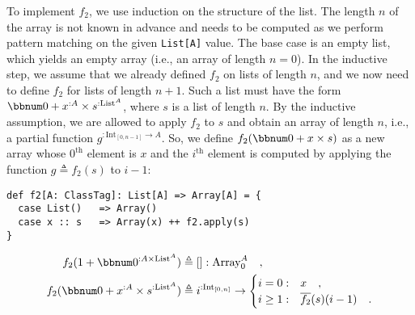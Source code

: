 To implement $f_{2}$, we use induction on the structure of the list.
The length $n$ of the array is not known in advance and needs to
be computed as we perform pattern matching on the given \lstinline!List[A]!
value. The base case is an empty list, which yields an empty array
(i.e., an array of length $n=0$). In the inductive step, we assume
that we already defined $f_{2}$ on lists of length $n$, and we now
need to define $f_{2}$ for lists of length $n+1$. Such a list must
have the form $\bbnum 0+x^{:A}\times s^{:\text{List}^{A}}$, where
$s$ is a list of length $n$. By the inductive assumption, we are
allowed to apply $f_{2}$ to $s$ and obtain an array of length $n$,
i.e., a partial function $g^{:\text{Int}_{[0,n-1]}\rightarrow A}$.
So, we define $f_{2}(\bbnum 0+x\times s)$ as a new array whose $0^{\text{th}}$
element is $x$ and the $i^{\text{th}}$ element is computed by applying
the function $g\triangleq f_{2}(s)$ to $i-1$:
\begin{lstlisting}
def f2[A: ClassTag]: List[A] => Array[A] = {
  case List()   => Array()
  case x :: s   => Array(x) ++ f2.apply(s)
}
\end{lstlisting}
\begin{align*}
f_{2}(1+\bbnum 0^{:A\times\text{List}^{A}}) & \triangleq[]:\text{Array}_{0}^{A}\quad,\\
f_{2}(\bbnum 0+x^{:A}\times s^{:\text{List}^{A}}) & \triangleq i^{:\text{Int}_{[0,n]}}\rightarrow\begin{cases}
i=0: & x\quad,\\
i\geq1: & \overline{f_{2}}(s)(i-1)\quad.
\end{cases}
\end{align*}

